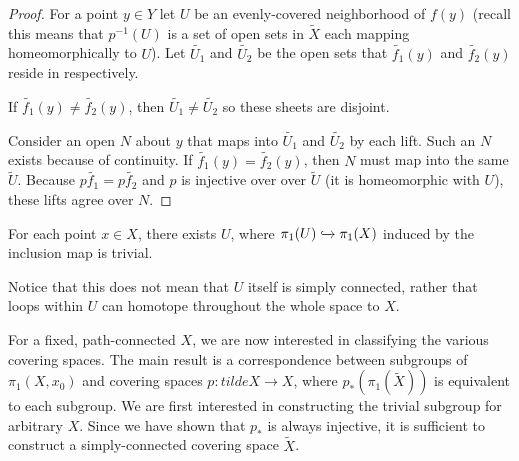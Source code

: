 \documentclass[10pt]{article}
\begin{document}
\begin{proof}
	For a point $y \in Y$ let $U$ be an evenly-covered neighborhood of $f(y)$
	(recall this means that $p^{-1}(U)$ is a set of open sets in $\tilde{X}$ each
	mapping homeomorphically to $U$). Let $\tilde{U_1}$ and $\tilde{U_2}$ be the
	open sets that $\tilde{f_1}(y)$ and $\tilde{f_2}(y)$ reside in respectively.

	If $\tilde{f_1}(y) \neq \tilde{f_2}(y)$, then $\tilde{U_1} \neq \tilde{U_2}$
	so these sheets are disjoint.

	Consider an open $N$ about $y$ that maps into $\tilde{U_1}$ and $\tilde{U_2}$
	by each lift. Such an $N$ exists because of continuity. If $\tilde{f_1}(y)
	= \tilde{f_2}(y)$, then $N$ must map into the same $\tilde{U}$. Because
	$p\tilde{f_1} = p\tilde{f_2}$ and $p$ is injective over over $\tilde{U}$ (it
	is homeomorphic with $U$), these lifts agree over $N$.
\end{proof}

\begin{definition}
	For each point $x \in X$, there exists $U$, where $\pi_1(U)
	\xhookrightarrow{}{\pi_1(X)}$ induced by the inclusion map is trivial.
\end{definition}

Notice that this does not mean that $U$ itself is simply connected, rather that
loops within $U$ can homotope throughout the whole space to $X$.

For a fixed, path-connected $X$, we are now interested in classifying the
various covering spaces. The main result is a correspondence between subgroups
of $\pi_1(X, x_0)$ and covering spaces $p: tilde{X} \to X$, where
$p_*(\pi_1(\tilde{X}))$ is equivalent to each subgroup. We are first interested
in constructing the trivial subgroup for arbitrary $X$. Since we have shown
that $p_*$ is always injective, it is sufficient to construct a simply-connected covering space $\tilde{X}$.
\end{document}
